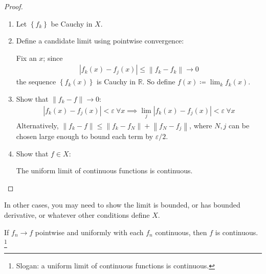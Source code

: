 \begin{proof}

\envlist

\begin{enumerate}
\def\labelenumi{\arabic{enumi}.}
\item
  Let \(\left\{{f_k}\right\}\) be Cauchy in \(X\).
\item
  Define a candidate limit using pointwise convergence:

  Fix an \(x\); since
  \begin{align*}
    {\left\lvert {f_k(x) - f_j(x)} \right\rvert}  \leq {\left\lVert {f_k - f_k} \right\rVert} \to 0
    \end{align*}
  the sequence \(\left\{{f_k(x)}\right\}\) is Cauchy in
  \({\mathbb{R}}\). So define \(f(x) \coloneqq\lim_k f_k(x)\).
\item
  Show that \({\left\lVert {f_k - f} \right\rVert} \to 0\):
  \begin{align*}
    {\left\lvert {f_k(x) - f_j(x)} \right\rvert} < \varepsilon ~\forall x \implies \lim_{j} {\left\lvert {f_k(x) - f_j(x)} \right\rvert} <\varepsilon ~\forall x
    \end{align*}
  Alternatively,
  \({\left\lVert {f_k-f} \right\rVert} \leq {\left\lVert {f_k - f_N} \right\rVert} + {\left\lVert {f_N - f_j} \right\rVert}\),
  where \(N, j\) can be chosen large enough to bound each term by
  \(\varepsilon/2\).
\item
  Show that \(f\in X\):

  The uniform limit of continuous functions is continuous.
\end{enumerate}

\end{proof}

\begin{remark}

In other cases, you may need to show the limit is bounded, or has
bounded derivative, or whatever other conditions define \(X\).

\end{remark}

\begin{theorem}

If \(f_n\to f\) pointwise and uniformly with each \(f_n\) continuous,
then \(f\) is continuous. \footnote{Slogan: a uniform limit of
  continuous functions is continuous.}

\end{theorem}

